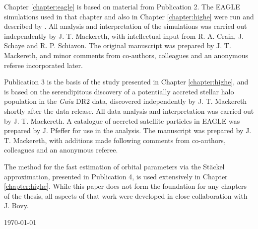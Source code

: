 Chapter \ref{chapter:eagle} is based on material from Publication 2. The EAGLE simulations used in that chapter and also in Chapter \ref{chapter:highe} were run and described by \citet{2015MNRAS.446..521S,2015MNRAS.450.1937C}. All analysis and interpretation of the simulations was carried out independently by J. T. Mackereth, with intellectual input from R. A. Crain, J. Schaye and R. P. Schiavon. The original manuscript was prepared by J. T. Mackereth, and minor comments from co-authors, colleagues and an anonymous referee incorporated later.

Publication 3 is the basis of the study presented in Chapter \ref{chapter:highe}, and is based on the serendipitous discovery of a potentially accreted stellar halo population in the \emph{Gaia} DR2 data, discovered independently by J. T. Mackereth shortly after the data release. All data analysis and interpretation was carried out by J. T. Mackereth. A catalogue of accreted satellite particles in EAGLE was prepared by J. Pfeffer for use in the analysis. The manuscript was prepared by J. T. Mackereth, with additions made following comments from co-authors, colleagues and an anonymous referee.

The method for the fast estimation of orbital parameters via the St\"ackel approximation, presented in Publication 4, is used extensively in Chapter \ref{chapter:highe}. While this paper does not form the foundation for any chapters of the thesis, all aspects of that work were developed in close collaboration with J. Bovy.



\vfill
{\sc \AuthorName \hfill\today}